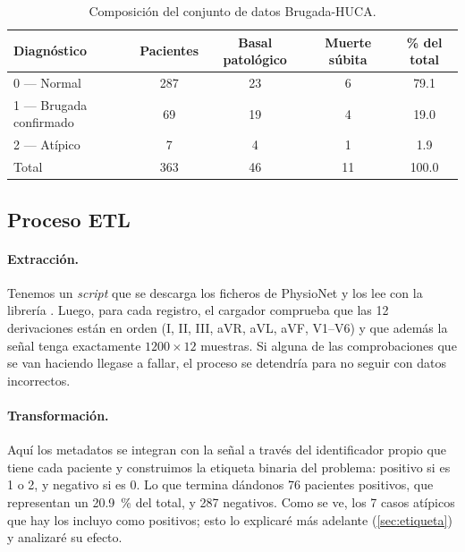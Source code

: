 \begin{table}[H]
\centering
\caption[Composición del conjunto de datos]{Composición del conjunto de datos Brugada-HUCA.}
\label{tab:composicion}
\small\setlength{\tabcolsep}{5pt}
\begin{tabular}{@{}lS[table-format=3.0]S[table-format=2.0]S[table-format=2.0]S[table-format=3.1]@{}}
\toprule
\textbf{Diagnóstico} & {\textbf{Pacientes}} & {\textbf{Basal patológico}} & {\textbf{Muerte súbita}} & {\textbf{\% del total}} \\
 --- Normal & 287 & 23 & 6 & 79.1 \\
1 --- Brugada confirmado & 69 & 19 & 4 & 19.0 \\
2 --- Atípico & 7 & 4 & 1 & 1.9 \\
\midrule
Total & 363 & 46 & 11 & 100.0 \\
\bottomrule
\end{tabular}
\end{table}

\subsection{Proceso ETL}

\paragraph{Extracción.} Tenemos un \emph{script} que se descarga los ficheros de PhysioNet y los lee con la librería . Luego, para cada registro, el cargador comprueba que las 12 derivaciones están en orden (I, II, III, aVR, aVL, aVF, V1--V6) y que además la señal tenga exactamente $1200 \times 12$ muestras. Si alguna de las comprobaciones que se van haciendo llegase a fallar, el proceso se detendría para no seguir con datos incorrectos.

\paragraph{Transformación.} Aquí los metadatos se integran con la señal a través del identificador propio que tiene cada paciente y construimos la etiqueta binaria del problema: positivo si  es 1 o 2, y negativo si  es 0. Lo que termina dándonos 76 pacientes positivos, que representan un \SI{20.9}{\percent} del total, y 287 negativos. Como se ve, los 7 casos atípicos que hay los incluyo como positivos; esto lo explicaré más adelante (\cref{sec:etiqueta}) y analizaré su efecto.

